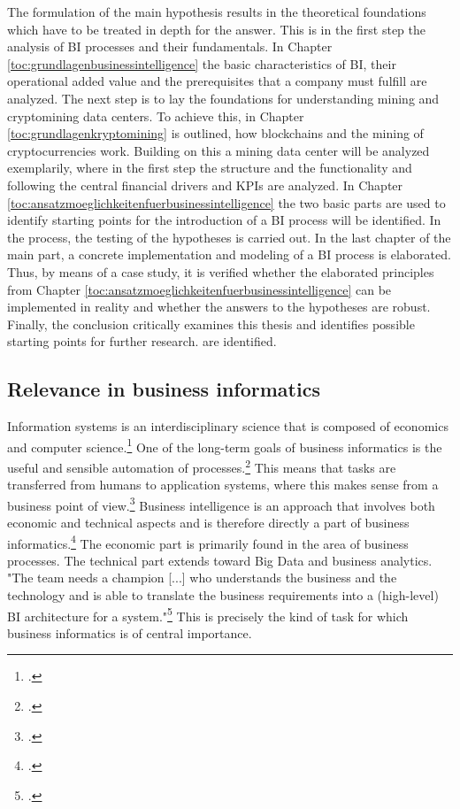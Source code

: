 The formulation of the main hypothesis results in the theoretical foundations which have to be treated in depth for the answer.
This is in the first step the analysis of \ac{BI} processes and their fundamentals. In Chapter \ref{toc:grundlagenbusinessintelligence}
the basic characteristics of \ac{BI}, their operational added value and the prerequisites that a company must fulfill are analyzed.
The next step is to lay the foundations for understanding mining and cryptomining data centers. To achieve this,
in Chapter \ref{toc:grundlagenkryptomining} is outlined, how blockchains and the mining of cryptocurrencies work. Building on this
a mining data center will be analyzed exemplarily, where in the first step the structure and the functionality and following the central
financial drivers and \acp{KPI} are analyzed. In Chapter \ref{toc:ansatzmoeglichkeitenfuerbusinessintelligence} the two
basic parts are used to identify starting points for the introduction of a \ac{BI} process will be identified. In the process, the testing of the
hypotheses is carried out. In the last chapter of the main part, a concrete implementation and modeling of a \ac{BI} process
is elaborated. Thus, by means of a case study, it is verified whether the elaborated principles from Chapter
\ref{toc:ansatzmoeglichkeitenfuerbusinessintelligence} can be implemented in reality and whether the answers to the hypotheses are robust.
Finally, the conclusion critically examines this thesis and identifies possible starting points for further research.
are identified.

\subsection{Relevance in business informatics} \label{toc:relevanzinderwirtschaftinformatik}

Information systems is an interdisciplinary science that is composed of economics and computer science.\footcite[Cf.][p. 5]{mertens2005grundzuge}
One of the long-term goals of business informatics is the useful and sensible
automation of processes.\footcite[Cf.][p. 4]{mertens2005grundzuge} This means that tasks are transferred from humans to application systems,
where this makes sense from a business point of view.\footcite[Cf.][p. 4]{mertens2005grundzuge}
Business intelligence is an approach that involves both economic and technical aspects and is therefore directly
a part of business informatics.\footcite[Cf.][p. 102]{azma2012business} The economic part is primarily found in the area of business processes.
The technical part extends toward Big Data and business analytics. "The
team needs a champion [...] who understands the business and the technology and is able to translate the business requirements into a
(high-level) \ac{BI} architecture for a system."\footcite[][p. 27]{yeoh2010critical} This is precisely the kind of task for which business informatics
is of central importance.

